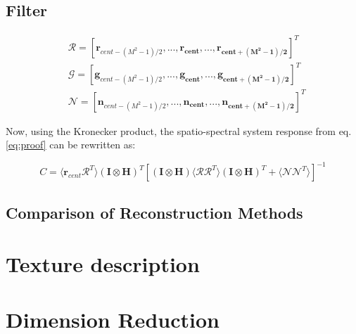 \subsection{Filter}
\blindtext

\begin{align}
&\mathbf{\mathcal{R}} = [\mathbf{r}_{cent-(M^2-1)/2}, ..., \mathbf{r_{cent}, ..., \mathbf{r}_{cent+(M^2-1)/2}}]^T  \nonumber \\
&\mathbf{\mathcal{G}} = [\mathbf{g}_{cent-(M^2-1)/2}, ..., \mathbf{g_{cent}, ..., \mathbf{g}_{cent+(M^2-1)/2}}]^T \nonumber  \\
&\mathbf{\mathcal{N}} = [\mathbf{n}_{cent-(M^2-1)/2}, ..., \mathbf{n_{cent}, ..., \mathbf{n}_{cent+(M^2-1)/2}}]^T
\end{align}

\noindent Now, using the Kronecker product, the spatio-spectral system response from eq. \ref{eq:proof} can be rewritten as:

\begin{equation}
C = \langle  \mathbf{r}_{cent} \mathcal{R}^{T} \rangle  (\mathbf{I} \otimes \mathbf{H})^T [(\mathbf{I} \otimes \mathbf{H})  \langle \mathbf{\mathcal{R}}\mathbf{\mathcal{R}}^{T} \rangle (\mathbf{I} \otimes \mathbf{H})^{T} +  \langle \mathbf{\mathcal{N}} \mathbf{\mathcal{N}}^{T} \rangle]^{-1}
\end{equation}


\subsection{Comparison of Reconstruction Methods}
\blindtext

\section{Texture description}
\blindtext


\section{Dimension Reduction}
\blindtext

